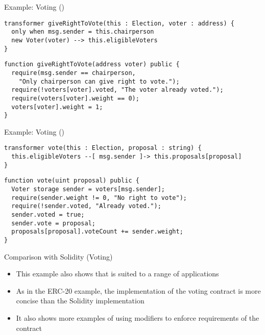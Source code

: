 \documentclass[leqno,presentation,usenames,dvipsnames]{beamer}
\begin{document}
\begin{frame}[fragile]{Example: Voting ()}
\begin{lstlisting}[language=flow, xleftmargin=-0.2em, basicstyle=\scriptsize\ttfamily]
transformer giveRightToVote(this : Election, voter : address) {
  only when msg.sender = this.chairperson
  new Voter(voter) --> this.eligibleVoters
}
\end{lstlisting}
\begin{lstlisting}[language=Solidity, xleftmargin=-0.2em, basicstyle=\scriptsize\ttfamily]
function giveRightToVote(address voter) public {
  require(msg.sender == chairperson,
    "Only chairperson can give right to vote.");
  require(!voters[voter].voted, "The voter already voted.");
  require(voters[voter].weight == 0);
  voters[voter].weight = 1;
}
\end{lstlisting}
\end{frame}

\begin{frame}[fragile]{Example: Voting ()}
\begin{lstlisting}[language=flow, xleftmargin=-0.2em, basicstyle=\scriptsize\ttfamily]
transformer vote(this : Election, proposal : string) {
  this.eligibleVoters --[ msg.sender ]-> this.proposals[proposal]
}
\end{lstlisting}
\begin{lstlisting}[language=Solidity, xleftmargin=-0.5em, basicstyle=\scriptsize\ttfamily]
function vote(uint proposal) public {
  Voter storage sender = voters[msg.sender];
  require(sender.weight != 0, "No right to vote");
  require(!sender.voted, "Already voted.");
  sender.voted = true;
  sender.vote = proposal;
  proposals[proposal].voteCount += sender.weight;
}
\end{lstlisting}
\end{frame}

\begin{frame}[fragile]{Comparison with Solidity (Voting)}
    \begin{itemize}
        \item This example also shows that \langName is suited to a range of applications
        \item As in the ERC-20 example, the \langName implementation of the voting contract is more concise than the Solidity implementation
        \item It also shows more examples of using modifiers to enforce requirements of the contract
    \end{itemize}
\end{frame}
\end{document}
